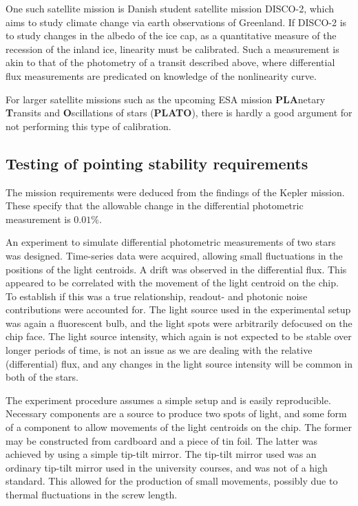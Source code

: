 \documentclass[../main.tex]{subfiles}
\begin{document}
One such satellite mission is Danish student satellite mission DISCO-2, which aims to study climate change via earth observations of Greenland. If DISCO-2 is to study changes in the albedo of the ice cap, as a quantitative measure of the recession of the inland ice, linearity must be calibrated. Such a measurement is akin to that of the photometry of a transit described above, where differential flux measurements are predicated on knowledge of the nonlinearity curve.

For larger satellite missions such as the upcoming ESA mission \textbf{PLA}netary \textbf{T}ransits and \textbf{O}scillations of stars (\textbf{PLATO}), there is hardly a good argument for not performing this type of calibration.

\subsection{Testing of pointing stability requirements}
The mission requirements were deduced from the findings of the Kepler mission. These specify that the allowable change in the differential photometric measurement is $0.01\%$.

An experiment to simulate differential photometric measurements of two stars was designed. Time-series data were acquired, allowing small fluctuations in the positions of the light centroids. A drift was observed in the differential flux. This appeared to be correlated with the movement of the light centroid on the chip. To establish if this was a true relationship,  readout- and photonic noise contributions were accounted for. The light source used in the experimental setup was again a fluorescent bulb, and the light spots were arbitrarily defocused on the chip face. The light source intensity, which again is not expected to be stable over longer periods of time, is not an issue as we are dealing with the relative (differential) flux, and any changes in the light source intensity will be common in both of the stars. 

The experiment procedure assumes a simple setup and is easily reproducible. Necessary components are a source to produce two spots of light, and some form of a component to allow movements of the light centroids on the chip. The former may be constructed from cardboard and a piece of tin foil. The latter was achieved by using a simple tip-tilt mirror. The tip-tilt mirror used was an ordinary tip-tilt mirror used in the university courses, and was not of a high standard. This allowed for the production of small movements, possibly due to thermal fluctuations in the screw length. 
\end{document}
